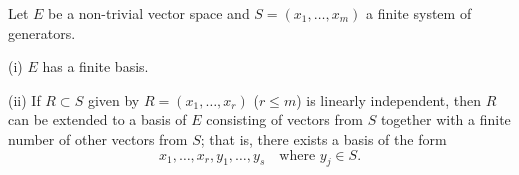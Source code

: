 Let $E$ be a non-trivial vector space and $S = (x_1, \ldots, x_m)$ a finite system of generators.

(i) $E$ has a finite basis.

(ii) If $R \subset S$ given by $R = (x_1, \ldots, x_r)$ ($r \leq m$) is linearly independent, then $R$ can be extended to a basis of $E$ consisting of vectors from $S$ together with a finite number of other vectors from $S$; that is, there exists a basis of the form
$$x_1, \ldots, x_r, y_1, \ldots, y_s \quad \text{where } y_j \in S.$$
